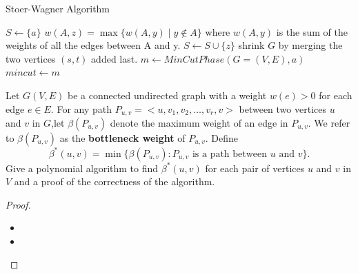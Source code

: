 \documentclass{article}
\newcounter{exercise}
\newcommand{\<}{
    \langle}
\renewcommand{\>}{
    \rangle}
\begin{document}
{\begin{itemize}
    \end{itemize}
\begin{algorithm}[htb]
    \caption{Stoer-Wagner Algorithm}
    \begin{algorithmic}[1]
            \State $S \leftarrow \{a\}$
                \State  $w(A,z)=\max\{w(A,y)\mid y\notin A\}$
                \State where $w(A,y)$ is the sum of the weights of all the edges between A and y.
                \State $S\leftarrow S\cup \{z\}$
                \State shrink $G$ by merging the two vertices $(s, t)$ added last.
            \EndWhile
            \Return 
        \EndProcedure
        \leavevmode\newline
                \State $m\leftarrow MinCutPhase(G=(V,E),a)$
                    \State $mincut \leftarrow m$
                \EndIf
            \EndWhile
        \EndProcedure
    \end{algorithmic}
\end{algorithm}



\begin{exercise}
Let $G(V,E)$ be a connected undirected graph with a weight $w(e)>0$ for each edge $e\in E$. For any path $P_{u,v}=<u,v_1,v_2,\ldots,v_r,v>$ between two vertices $u$ and $v$ in $G$,let $\beta(P_{u,v})$ denote the maximum weight of an edge in $P_{u,v}$. We refer to $\beta(P_{u,v})$ as the \textbf{bottleneck weight} of $P_{u,v}$. Define
\begin{displaymath}
\beta^*(u,v)=\min\{\beta(P_{u,v}):P_{u,v}\text{ is a path between $u$ and $v$}\}.
\end{displaymath}
Give a polynomial algorithm to find $\beta^*(u,v)$ for each pair of vertices $u$ and $v$ in $V$ and a proof of the correctness of the algorithm.
\end{exercise}
\begin{proof} 
    \leavevmode\newline
    \begin{itemize}
        \item
        \item
    \end{itemize}
\end{proof}



}
\end{document}
